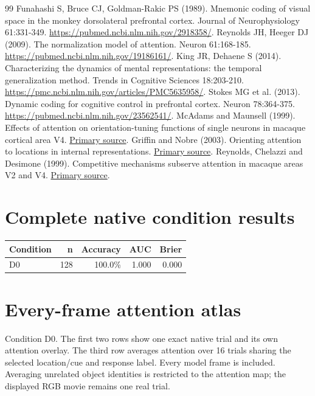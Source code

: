 \documentclass[11pt]{article}
\begin{document}
\begin{thebibliography}{99}
 Funahashi S, Bruce CJ, Goldman-Rakic PS (1989). Mnemonic coding of visual space in the monkey dorsolateral prefrontal cortex. Journal of Neurophysiology 61:331-349. \url{https://pubmed.ncbi.nlm.nih.gov/2918358/}.
 Reynolds JH, Heeger DJ (2009). The normalization model of attention. Neuron 61:168-185. \url{https://pubmed.ncbi.nlm.nih.gov/19186161/}.
 King JR, Dehaene S (2014). Characterizing the dynamics of mental representations: the temporal generalization method. Trends in Cognitive Sciences 18:203-210. \url{https://pmc.ncbi.nlm.nih.gov/articles/PMC5635958/}.
 Stokes MG et al. (2013). Dynamic coding for cognitive control in prefrontal cortex. Neuron 78:364-375. \url{https://pubmed.ncbi.nlm.nih.gov/23562541/}.
 McAdams and Maunsell (1999). Effects of attention on orientation-tuning functions of single neurons in macaque cortical area V4. \href{https://pubmed.ncbi.nlm.nih.gov/9870971/}{Primary source}.
 Griffin and Nobre (2003). Orienting attention to locations in internal representations. \href{https://pubmed.ncbi.nlm.nih.gov/14709235/}{Primary source}.
 Reynolds, Chelazzi and Desimone (1999). Competitive mechanisms subserve attention in macaque areas V2 and V4. \href{https://pubmed.ncbi.nlm.nih.gov/10024360/}{Primary source}.
\end{thebibliography}\clearpage\appendix\section{Complete native condition results}
\small\begin{longtable}{p{}rrrr}\toprule Condition & n & Accuracy & AUC & Brier\\\midrule\endhead
D0 & 128 & 100.0\% & 1.000 & 0.000\\
\bottomrule\end{longtable}\normalsize\section{Every-frame attention atlas}
Condition D0. The first two rows show one exact native trial and its own attention overlay. The third row averages attention over 16 trials sharing the selected location/cue and response label. Every model frame is included. Averaging unrelated object identities is restricted to the attention map; the displayed RGB movie remains one real trial.
\end{document}
